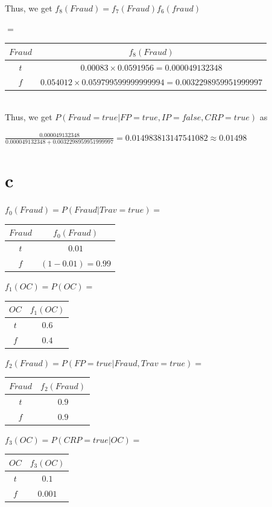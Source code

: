 \documentclass[10pt]{article}
\begin{document}
\begin{enumerate}
	Thus, we get $f_8(Fraud) = f_7(Fraud) f_6(fraud)$
	
	$=$
	\begin{tabular}{|c|c|}
	\hline
 	  $Fraud$ & $f_8(Fraud)$ \\
	\hline
	  $t$ & $0.00083 \times 0.0591956 = 0.000049132348$  \\
	\hline
	  $f$ & $0.054012 \times 0.059799599999999994 = 0.0032298959951999997$ \\
	\hline
	\end{tabular}\\

	Thus, we get $P(Fraud  = true | FP = true, IP = false, CRP = true)$ as 
	
	$\frac{ 0.000049132348}{ 0.000049132348 +0.0032298959951999997 } = 0.014983813147541082 \approx 0.01498$
	
	\newpage
\part{c} 

	$f_0(Fraud) = P(Fraud | Trav = true) =$
	\begin{tabular}{|c|c|}
	\hline
 	  $Fraud$ & $f_0(Fraud)$ \\
	\hline
	  $t$ & $ 0.01 $  \\
	\hline
	  $f$ & $(1 - 0.01) = 0.99$ \\
	\hline
	\end{tabular}
	
	$f_1(OC) = P(OC) = $
	\begin{tabular}{|c|c|}
	\hline
 	  $OC$ & $f_1(OC)$ \\
	\hline
	  $t$ & $ 0.6$  \\
	\hline
	  $f$ & $0.4$ \\
	\hline
	\end{tabular}
	
	$f_2(Fraud) = P(FP = true | Fraud, Trav = true) = $
	\begin{tabular}{|c|c|}
	\hline
 	  $Fraud$ & $f_2(Fraud)$ \\
	\hline
	  $t$ & $ 0.9$  \\
	\hline
	  $f$ & $0.9$ \\
	\hline
	\end{tabular}
	
	$f_3(OC) = P(CRP = true | OC) = $
	\begin{tabular}{|c|c|}
	\hline
 	  $OC$ & $f_3(OC)$ \\
	\hline
	  $t$ & $ 0.1$  \\
	\hline
	  $f$ & $0.001$ \\
	\hline
	\end{tabular}
	

\end{enumerate}
\end{document}
